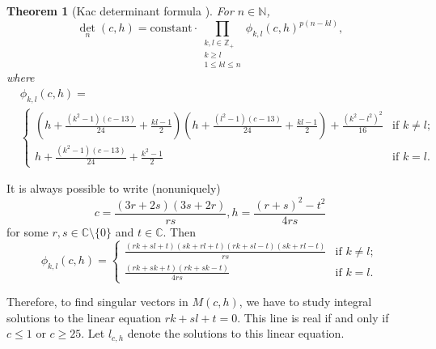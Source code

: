 \documentclass[notheorems]{beamer}
\newtheorem{theorem}{Theorem}
\theoremstyle{remark}
\begin{document}
\begin{frame}
  \begin{theorem}[Kac determinant formula {\cite[Theorem 4.2]{iohara_representation_2011}}]
    \label{thr:1}
    For $n \in \mathbb{N}$,
    \begin{equation*}
      \textstyle\det_n(c, h) = \displaystyle\text{constant}\cdot\prod_{\substack{k, l \in \mathbb{Z}_+ \\ k \ge l \\ 1 \le kl \le n}}\phi_{k, l}(c, h)^{p(n - kl)},
    \end{equation*}
    where
    \begin{align*}
      &\phi_{k, l}(c, h) = \\
      &\begin{cases}
        (h + \frac{(k^2 - 1)(c - 13)}{24} + \frac{kl - 1}{2})(h + \frac{(l^2 - 1)(c - 13)}{24} + \frac{kl - 1}{2}) + \frac{(k^2 - l^2)^2}{16} &\text{if $k \neq l$};\\
        h + \frac{(k^2 - 1)(c - 13)}{24} + \frac{k^2 - 1}{2} &\text{if $k = l$}.
      \end{cases}
    \end{align*}
  \end{theorem}
\end{frame}

\begin{frame}
  It is always possible to write (nonuniquely)
  \begin{equation*}
    c = \frac{(3r + 2s)(3s + 2r)}{rs}, h = \frac{(r + s)^2 - t^2}{4rs}
  \end{equation*}
  for some $r, s \in \mathbb{C} \setminus \{0\}$ and $t \in \mathbb{C}$.
  Then
  \begin{equation*}
    \phi_{k, l}(c, h) =
    \begin{cases}
      \frac{(rk + sl + t)(sk + rl + t)(rk + sl - t)(sk + rl - t)}{rs} &\text{if $k \neq l$};\\
      \frac{(rk + sk + t)(rk + sk - t)}{4rs} &\text{if $k = l$}.
    \end{cases}
  \end{equation*}

  Therefore, to find singular vectors in $M(c, h)$, we have to study integral solutions to the linear equation $rk + sl + t = 0$.
  This line is real if and only if $c \le 1$ or $c \ge 25$.
  Let $l_{c, h}$ denote the solutions to this linear equation.
\end{frame}


\end{document}
